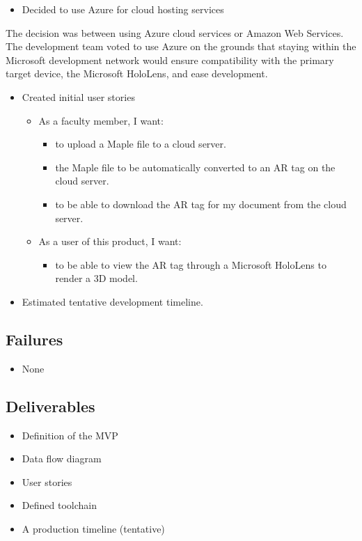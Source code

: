         \begin{itemize} \item Decided to use Azure for cloud hosting services \end {itemize}
        \hspace{7mm}The decision was between using Azure cloud services or Amazon Web Services. The development team voted to use Azure on the grounds that staying within the Microsoft development network would ensure compatibility with the primary target device, the Microsoft HoloLens, and ease development.

        \begin{itemize} 
            \item Created initial user stories 
            \begin{itemize}
                \item As a faculty member, I want:
                \begin{itemize} 
                    \item to upload a Maple file to a cloud server.
                    \item the Maple file to be automatically converted to an AR tag on the cloud server.
                    \item to be able to download the AR tag for my document from the cloud server.
                \end{itemize}
                \item As a user of this product, I want: 
                \begin{itemize}
                    \item to be able to view the AR tag through a Microsoft HoloLens to render a 3D model.
                \end{itemize}
            \end{itemize}
            \item Estimated tentative development timeline.
        \end{itemize}

    \subsection{Failures}
    \label{sec:Sprint0_failures}
        \begin{itemize} \item None \end{itemize}

    \subsection{Deliverables}
    \label{sec:Sprint0_deliverables}
        \begin{itemize} 
            \item Definition of the MVP
            \item Data flow diagram            
            \item User stories
            \item Defined toolchain
            \item A production timeline (tentative)
        \end{itemize}

